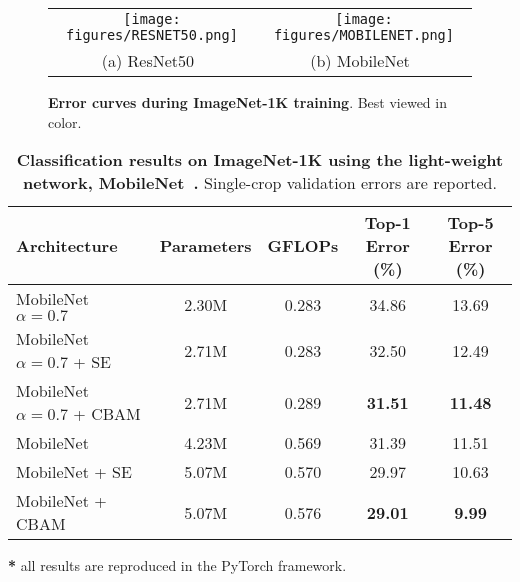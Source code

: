 \documentclass[runningheads]{llncs}
\newcommand*{\modulenameabb}{CBAM}
\begin{document}
\begin{figure}[t]
\begin{tabular}{cc}
\texttt{[image: figures/RESNET50.png]}& \texttt{[image: figures/MOBILENET.png]} \\
\small (a) ResNet50~\cite{he2016deep} & \small (b) MobileNet~\cite{howard2017mobilenets}
\end{tabular}\vspace{2mm}
\caption{\textbf{Error curves during ImageNet-1K training}. Best viewed in color.}
\label{fig:resnet50_plot}
\end{figure}



\begin{table}[t]
\begin{center}
\begin{adjustbox}{max width=\textwidth}
\begin{tabular}{l|c|c|c|c }
\hline
Architecture  & Parameters & GFLOPs & Top-1 Error (\%) & Top-5 Error (\%) \\
\hline\hline
MobileNet \cite{howard2017mobilenets} \(\alpha=0.7\)                           & 2.30M & 0.283 & 34.86 & 13.69 \\
MobileNet \cite{howard2017mobilenets} \(\alpha=0.7\) + SE~\cite{hu2017squeeze} & 2.71M & 0.283 & 32.50 & 12.49 \\
MobileNet \cite{howard2017mobilenets} \(\alpha=0.7\) + \modulenameabb          & 2.71M & 0.289 & \textbf{31.51} & \textbf{11.48} \\
\hline
MobileNet \cite{howard2017mobilenets}                           & 4.23M & 0.569 & 31.39 & 11.51 \\
MobileNet \cite{howard2017mobilenets} + SE~\cite{hu2017squeeze} & 5.07M & 0.570 & 29.97 & 10.63 \\
MobileNet \cite{howard2017mobilenets} + \modulenameabb          & 5.07M & 0.576 & \textbf{29.01} & \textbf{9.99} \\
\hline
\end{tabular}
\end{adjustbox}
\end{center}
\begin{tablenotes}
\scriptsize
\item \vspace{-3mm}\hspace*{\fill} \textbf{*} all results are reproduced in the PyTorch framework.
\end{tablenotes}\vspace{2mm}
\caption{ \textbf{Classification results on ImageNet-1K using the light-weight network, MobileNet~\cite{howard2017mobilenets}.} Single-crop validation errors are reported.}
\label{table:imagenet_exp_2}
\vspace{-6mm}
\end{table}
\end{document}
